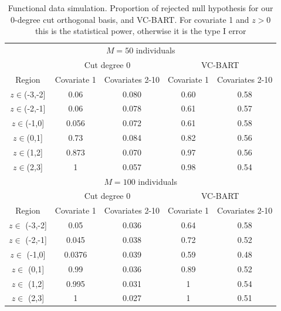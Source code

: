\begin{table}
\begin{center}
\begin{tabular}{ccccc} %
\multicolumn{5}{c}{$M=50$ individuals}        \\ %
& \multicolumn{2}{c}{Cut degree 0} & \multicolumn{2}{c}{VC-BART} \\
 Region         & Covariate 1 & Covariates 2-10 &  Covariate 1  &  Covariates 2-10  \\
$z \in $(-3,-2] & 0.06         & 0.080          &  0.60         &  0.58 \\ 
$z \in $(-2,-1] & 0.06         & 0.078          &  0.61         &  0.57 \\ 
$z \in $(-1,0]  & 0.056        & 0.072          &  0.61         &  0.58 \\ 
$z \in $(0,1]   & 0.73         & 0.084          &  0.82         &  0.56 \\ 
$z \in $(1,2]   & 0.873        & 0.070          &  0.97         &  0.56 \\ 
$z \in $(2,3]   & 1            & 0.057          &  0.98         &  0.54 \\ 
\multicolumn{5}{c}{$M=100$ individuals} \\ %
& \multicolumn{2}{c}{Cut degree 0} & \multicolumn{2}{c}{VC-BART} \\
 Region          & Covariate 1   & Covariates 2-10 &  Covariate 1 &  Covariates 2-10 \\
$z \in $ (-3,-2] & 0.05          & 0.036           &  0.64        &   0.58           \\
$z \in $ (-2,-1] & 0.045         & 0.038           &  0.72        &   0.52           \\ 
$z \in $ (-1,0]  & 0.0376        & 0.039           &  0.59        &   0.48           \\ 
$z \in $ (0,1]   & 0.99          & 0.036           &  0.89        &   0.52           \\ 
$z \in $ (1,2]   & 0.995         & 0.031           &  1           &   0.54           \\ 
$z \in $ (2,3]   & 1             & 0.027           &  1           &   0.51           \\ 
\end{tabular}
\end{center}
\caption{Functional data simulation. Proportion of rejected null hypothesis for our 0-degree cut orthogonal basis,  and VC-BART.  For covariate 1 and $z>0$ this is the statistical power, otherwise it is the type I error}
\label{tab:simfda_10covar}
\end{table}


